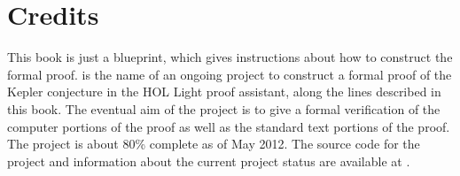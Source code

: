 
\chapter{Credits}\label{sec:credit}

This book is just a blueprint, which gives instructions about how to
construct the formal proof.
 is the name of an ongoing project to construct a
formal proof of the Kepler conjecture in the HOL Light proof
assistant, along the lines described in this book.  The eventual aim
of the project is to give a formal verification of the computer
portions of the proof as well as the standard text portions of the
proof.  The project is about 80\% complete as of May 2012.  
 The source code for the project and
information about the current project status are available at
\cite{website:FlyspeckProject}.



